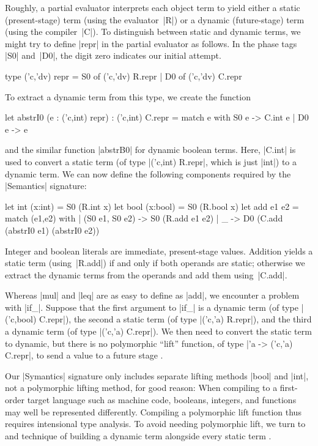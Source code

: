 Roughly, a partial evaluator interprets each object term to yield either
a static (present-stage) term (using the evaluator~|R|) or
a dynamic (future-stage) term (using the compiler~|C|).  To
distinguish between static and dynamic terms, we might try to define
|repr| in the partial evaluator as follows.
In the phase tags |S0| and~|D0|, the digit zero indicates
our initial attempt.
\begin{code}
type ('c,'dv) repr = S0 of ('c,'dv) R.repr | D0 of ('c,'dv) C.repr
\end{code}
To extract a dynamic term from this type, we create the function
\begin{code}
let abstrI0 (e : ('c,int) repr) : ('c,int) C.repr =
  match e with S0 e -> C.int e | D0 e -> e
\end{code}
and the similar function |abstrB0| for dynamic boolean terms. Here, 
|C.int| is used to convert a static term (of type |('c,int) R.repr|, 
which is just |int|) to a dynamic term. We can now define the following
components required by the |Semantics| signature:
\begin{code}
let int  (x:int)  = S0 (R.int x)
let bool (x:bool) = S0 (R.bool x)
let add e1 e2 = match (e1,e2) with
  | (S0 e1, S0 e2) -> S0 (R.add e1 e2)
  | _ -> D0 (C.add (abstrI0 e1) (abstrI0 e2))
\end{code}
Integer and boolean literals are immediate, present-stage
values. Addition yields a static term (using~|R.add|) if and only 
if both operands are static; otherwise we extract the dynamic terms 
from the operands and add them using~|C.add|.

Whereas |mul| and |leq| are as easy to define as |add|, we encounter
a problem with |if_|.  Suppose that the first argument to |if_| 
is a dynamic term
(of type |('c,bool) C.repr|), the second a static term 
(of type |('c,'a) R.repr|), and the third a
dynamic term (of type |('c,'a) C.repr|). We then need to convert
the static term to dynamic, but there is no polymorphic ``lift''
function, of type |'a -> ('c,'a) C.repr|, to send a value to a future stage
\citep{xi-guarded,WalidPOPL03}.
\begin{comment}
(By the way, if we
were to add polymorphic \texttt{lift} to the type class
\texttt{Symantics repr}, then \texttt{repr} would become an instance of
\texttt{Applicative} and thus \texttt{Functor}:\texttt{ fmap
f = app (lift f)~}.)
\end{comment}

Our |Symantics| signature only includes separate lifting methods |bool| and
|int|, not a polymorphic lifting method, for good reason:
When compiling to a first-order target language such as machine code,
booleans, integers, and functions may well be represented differently.
Compiling a polymorphic lift function thus requires intensional type
analysis.  To avoid needing polymorphic lift, we turn to
 and  technique of
building a dynamic term alongside every static term \citep{sumii-hybrid}.

